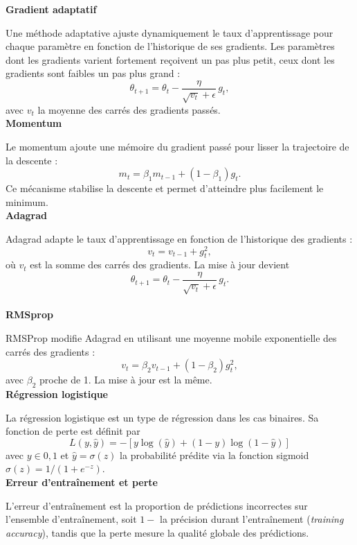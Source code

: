 \documentclass[a4paper,12pt]{article}
\begin{document}
\noindent\textbf{Gradient adaptatif}\\
\par Une méthode adaptative ajuste dynamiquement le taux d’apprentissage
pour chaque paramètre en fonction de l’historique de ses gradients.
Les paramètres dont les gradients varient fortement reçoivent un pas plus
petit, ceux dont les gradients sont faibles un pas plus grand :
\[
\theta_{t+1} = \theta_t - \frac{\eta}{\sqrt{v_t} + \epsilon} \, g_t,
\]
avec $v_t$ la moyenne des carrés des gradients passés.\\

\noindent\textbf{Momentum}\\
\par Le momentum ajoute une mémoire du gradient passé pour lisser la
trajectoire de la descente :
\[
m_t = \beta_1 m_{t-1} + (1 - \beta_1) g_t.
\]
Ce mécanisme stabilise la descente et permet d’atteindre plus facilement le minimum.\\

\noindent\textbf{Adagrad}\\
\par Adagrad adapte le taux d’apprentissage en fonction de l’historique des
gradients :
\[v_t = v_{t-1} + g_t^2,
\]
où $v_t$ est la somme des carrés des gradients. La mise à jour devient
\[\theta_{t+1} = \theta_t - \frac{\eta}{\sqrt{v_t} + \epsilon} \, g_t.
\] \\

\noindent\textbf{RMSprop}\\
\par RMSProp modifie Adagrad en utilisant une moyenne mobile exponentielle
des carrés des gradients :
\[v_t = \beta_2 v_{t-1} + (1 - \beta_2) g_t^2,
\]
avec $\beta_2$ proche de 1. La mise à jour est la même.\\

\noindent\textbf{Régression logistique}\\
\par La régression logistique est un type de régression dans les cas binaires. Sa fonction de perte est définit par 
$$
L(y, \hat{y}) = -[y \log(\hat{y}) + (1-y) \log(1-\hat{y})]
$$  
avec $y\in{0,1}$ et $\hat{y}=\sigma(z)$ la probabilité prédite via la fonction sigmoid $\sigma(z) = 1/(1 + e^{-z})$. \\

\noindent\textbf{Erreur d'entraînement et perte}\\
\par L'erreur d'entraînement est la proportion de prédictions incorrectes sur l'ensemble d'entraînement, soit $1-$ la précision durant l'entraînement (\textit{training accuracy}), tandis que la perte mesure la qualité globale des prédictions.\\
\end{document}
